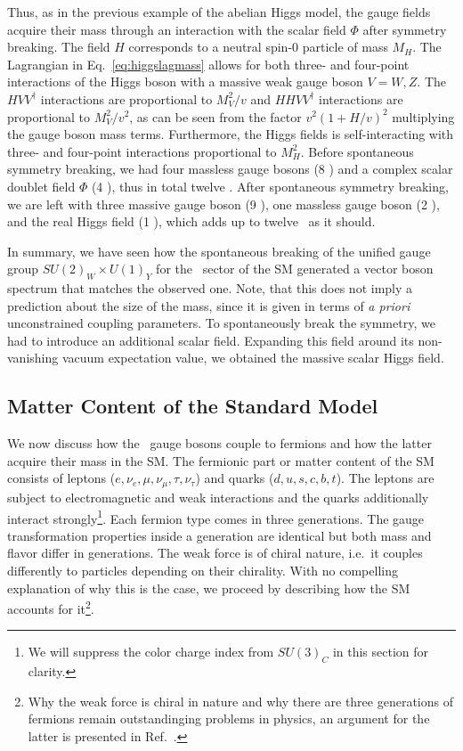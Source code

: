 Thus, as in the previous example of the abelian Higgs model, the gauge
fields acquire their mass through an interaction with the scalar
field $\Phi$ after symmetry breaking. The field $H$ corresponds to a
neutral spin-0 particle of mass $M_H$. The Lagrangian in
Eq.~\eqref{eq:higgslagmass} allows for both three- and four-point
interactions of the Higgs boson with a massive weak gauge boson $V=W,Z$. The
$HVV^\dagger$ interactions are proportional to $M_V^2/v$ and
$HHVV^\dagger$ interactions are proportional to $M_V^2/v^2$, as can be
seen from the factor $v^2(1+H/v)^2$ multiplying the gauge boson mass
terms. Furthermore, the Higgs fields is self-interacting with three-
and four-point interactions proportional to $M_H^2$. Before
spontaneous symmetry breaking, we had four massless gauge bosons (8
\dof) and a complex scalar doublet
field $\Phi$ (4 \dof), thus in total twelve \dof. After spontaneous symmetry
breaking, we are left with three massive gauge boson (9 \dof), one
massless gauge boson (2 \dof), and the real Higgs field (1 \dof), which adds up to twelve \dof~as it should.


In summary, we have seen how the spontaneous breaking of the unified
gauge group $SU(2)_W\times U(1)_Y$ for the \ew~sector of the SM
generated a vector boson spectrum that matches the observed
one. Note, that this does not imply a
  prediction about the size of the mass, since it is given in terms of
  \textit{a priori} unconstrained coupling parameters. To spontaneously break the symmetry, we had to introduce an
additional scalar field. Expanding this field around its non-vanishing
vacuum expectation value, we obtained the massive scalar Higgs field. 

\subsection{Matter Content of the Standard Model}
\label{sec:mattercont}
We now discuss how the \ew~gauge bosons couple to fermions and how the
latter acquire their mass in the SM. The fermionic part or matter
content of the SM consists of
leptons ($e,\nu_e,\mu,\nu_\mu,\tau,\nu_\tau$) and quarks
($d,u,s,c,b,t$). The leptons are subject to electromagnetic and weak
interactions and the quarks additionally interact
strongly\footnote{We will suppress the color charge index from
  $SU(3)_C$ in this section for
clarity.}. Each fermion type comes in three generations. The
gauge transformation properties inside a generation are identical but
both mass and flavor differ in generations. The weak force is of chiral nature,
i.e.~it couples
differently to particles depending on their chirality. With no compelling explanation of why this is the case,
we proceed by describing how the SM accounts for it\footnote{Why the weak force is
  chiral in nature and why
  there are three generations of fermions remain outstandinging problems in physics, an argument for the latter is presented in Ref.~\cite{vanderBij:2007fe}.}.


